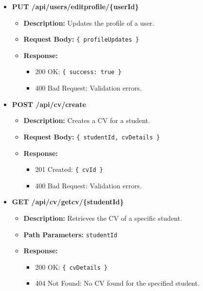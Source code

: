 \begin{itemize}
    \item \textbf{PUT /api/users/editprofile/\{userId\}}  
    \begin{itemize}
        \item \textbf{Description:} Updates the profile of a user.
        \item \textbf{Request Body:} \texttt{\{ profileUpdates \}}
        \item \textbf{Response:}
        \begin{itemize}
            \item 200 OK: \texttt{\{ success: true \}}
            \item 400 Bad Request: Validation errors.
        \end{itemize}
    \end{itemize}

    \item \textbf{POST /api/cv/create}  
    \begin{itemize}
        \item \textbf{Description:} Creates a CV for a student.
        \item \textbf{Request Body:} \texttt{\{ studentId, cvDetails \}}
        \item \textbf{Response:}
        \begin{itemize}
            \item 201 Created: \texttt{\{ cvId \}}
            \item 400 Bad Request: Validation errors.
        \end{itemize}
    \end{itemize}
    
    \item \textbf{GET /api/cv/getcv/\{studentId\}}  
    \begin{itemize}
        \item \textbf{Description:} Retrieves the CV of a specific student.
        \item \textbf{Path Parameters:} \texttt{studentId}
        \item \textbf{Response:}
        \begin{itemize}
            \item 200 OK: \texttt{\{ cvDetails \}}
            \item 404 Not Found: No CV found for the specified student.
        \end{itemize}
    \end{itemize}


\end{itemize}

